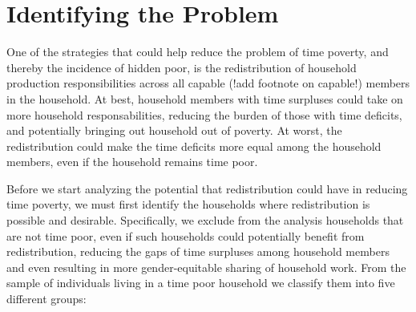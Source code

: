 \documentclass[
  11pt,
]{article}
\begin{document}
\section{Identifying the Problem}\label{sec-problem}

One of the strategies that could help reduce the problem of time
poverty, and thereby the incidence of hidden poor, is the redistribution
of household production responsibilities across all capable (!add
footnote on capable!) members in the household. At best, household
members with time surpluses could take on more household
responsabilities, reducing the burden of those with time deficits, and
potentially bringing out household out of poverty. At worst, the
redistribution could make the time deficits more equal among the
household members, even if the household remains time poor.

Before we start analyzing the potential that redistribution could have
in reducing time poverty, we must first identify the households where
redistribution is possible and desirable. Specifically, we exclude from
the analysis households that are not time poor, even if such households
could potentially benefit from redistribution, reducing the gaps of time
surpluses among household members and even resulting in more
gender-equitable sharing of household work. From the sample of
individuals living in a time poor household we classify them into five
different groups:
\end{document}
